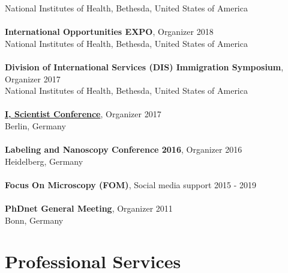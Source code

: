 \documentclass[margin,line]{res}
\begin{document}
\begin{resume}
National Institutes of Health, Bethesda, United States of America\\
\vspace*{-3mm}\\
{\bf International Opportunities EXPO}, Organizer \hfill {2018}\\
National Institutes of Health, Bethesda, United States of America\\
\vspace*{-3mm}\\
{\bf Division of International Services (DIS) Immigration Symposium}, Organizer  \hfill {2017}\\
National Institutes of Health, Bethesda, United States of America\\
\vspace*{-3mm}\\
{\bf \href{https://www.iscientist.berlin/}{I, Scientist Conference}},  Organizer \hfill {2017}\\
Berlin, Germany\\
\vspace*{-3mm}\\
{\bf Labeling and Nanoscopy Conference 2016}, Organizer \hfill {2016}\\
Heidelberg, Germany\\
\vspace*{-3mm}\\
{\bf Focus On Microscopy (FOM)}, Social media support \hfill {2015 - 2019}\\
\vspace*{-3mm}\\
{\bf PhDnet General Meeting}, Organizer \hfill {2011}\\
Bonn, Germany


\section{\sc Professional Services}


\end{resume}
\end{document}
